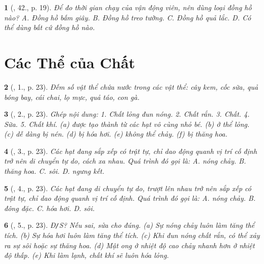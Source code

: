 \documentclass{article}
\newtheorem{baitoan}{}
\begin{document}
\begin{baitoan}[\cite{ncpt_KHTN_6_tap_1}, 42., p. 19]
	Để đo thời gian chạy của vận động viên, nên dùng loại đồng hồ nào? {\sf A.} Đồng hồ bấm giây. {\sf B.} Đồng hồ treo tường. {\sf C.} Đồng hồ quả lắc. {\sf D.} Có thể dùng bất cứ đồng hồ nào.
\end{baitoan}


\section{Các Thể của Chất}

\begin{baitoan}[\cite{ncpt_KHTN_6_tap_1}, 1., p. 23]
	Đếm số vật thể chứa nước trong các vật thể: cây kem, cốc sữa, quả bóng bay, cái chai, lọ mực, quả táo, con gà.
\end{baitoan}

\begin{baitoan}[\cite{ncpt_KHTN_6_tap_1}, 2., p. 23]
	Ghép nội dung: 1. Chất lỏng đun nóng. 2. Chất rắn. 3. Chất. 4. Sữa. 5. Chất khí. (a) được tạo thành từ các hạt vô cùng nhỏ bé. (b) ở thể lỏng. (c) dễ dàng bị nén. (d) bị hóa hơi. (e) không thể chảy. (f) bị thăng hoa.
\end{baitoan}

\begin{baitoan}[\cite{ncpt_KHTN_6_tap_1}, 3., p. 23]
	Các hạt đang sắp xếp có trật tự, chỉ dao động quanh vị trí cố định trở nên di chuyển tự do, cách xa nhau. Quá trình đó gọi là: {\sf A.} nóng chảy. {\sf B.} thăng hoa. {\sf C.} sôi. {\sf D.} ngưng kết.
\end{baitoan}

\begin{baitoan}[\cite{ncpt_KHTN_6_tap_1}, 4., p. 23]
	Các hạt đang di chuyển tự do, trượt lên nhau trở nên sắp xếp có trật tự, chỉ dao động quanh vị trí cố định. Quá trình đó gọi là: {\sf A.} nóng chảy. {\sf B.} đông đặc. {\sf C.} hóa hơi. {\sf D.} sôi.
\end{baitoan}

\begin{baitoan}[\cite{ncpt_KHTN_6_tap_1}, 5., p. 23]
	{\rm Đ{\tt/}S?} Nếu sai, sửa cho đúng. (a) Sự nóng chảy luôn làm tăng thể tích. (b) Sự hóa hơi luôn làm tăng thể tích. (c) Khi đun nóng chất rắn, có thể xảy ra sự sôi hoặc sự thăng hoa. (d) Mật ong ở nhiệt độ cao chảy nhanh hơn ở nhiệt độ thấp. (e) Khi làm lạnh, chất khí sẽ luôn hóa lỏng.
\end{baitoan}
\end{document}
